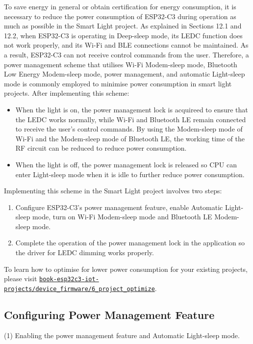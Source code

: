 \documentclass[a4paper,12pt,openany]{book}
\begin{document}
To save energy in general or obtain certification for energy consumption, it is necessary to reduce the power consumption of ESP32-C3 during operation as much as possible in the Smart Light project. As explained in Sections 12.1 and 12.2, when ESP32-C3 is operating in Deep-sleep mode, its LEDC function does not work properly, and its Wi-Fi and BLE connections cannot be maintained. As a result, ESP32-C3 can not receive control commands from the user. Therefore, a power management scheme that utilises Wi-Fi Modem-sleep mode, Bluetooth Low Energy Modem-sleep mode, power management, and automatic Light-sleep mode is commonly employed to minimise power consumption in smart light projects. After implementing this scheme:

\begin{itemize}[leftmargin=1.5em]
    \item When the light is on, the power management lock is acquireed to ensure that the LEDC works normally, while Wi-Fi and Bluetooth LE remain connected to receive the user's control commands. By using the Modem-sleep mode of Wi-Fi and the Modem-sleep mode of Bluetooth LE, the working time of the RF circuit can be reduced to reduce power consumption.
    \item When the light is off, the power management lock is released so CPU can enter Light-sleep mode when it is idle to further reduce power consumption.
\end{itemize}

Implementing this scheme in the Smart Light project involves two steps:

\begin{enumerate}[label=(\arabic*)]
    \item Configure ESP32-C3’s power management feature, enable Automatic Light-sleep mode, turn on Wi-Fi Modem-sleep mode and Bluetooth LE Modem-sleep mode.
    \item Complete the operation of the power management lock in the application so the driver for LEDC dimming works properly.
\end{enumerate}

To learn how to optimise for lower power consumption for your existing projects, please visit \href{https://github.com/espressif/book-esp32c3-iot-projects/tree/main/device_firmware/6_project_optimize}{\texttt{book-esp32c3-iot-projects/device\_firmware/6\_project\_optimize}}.

\subsection{Configuring Power Management Feature}
(1) Enabling the power management feature and Automatic Light-sleep mode.
\end{document}
